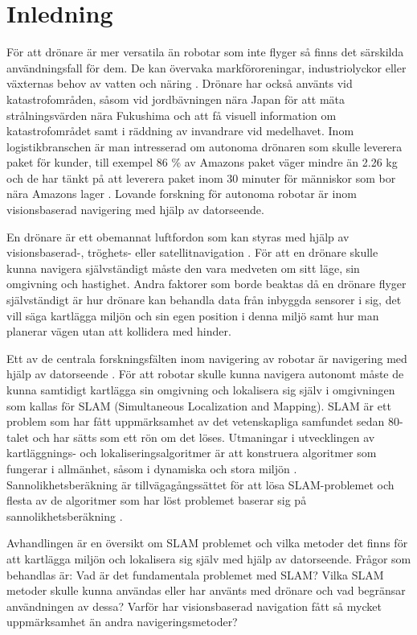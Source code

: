 \chapter{Inledning}

För att drönare är mer versatila än robotar som inte flyger så finns det särskilda användningsfall för dem. De kan övervaka markföroreningar, industriolyckor eller växternas behov av vatten och näring \citep{crowdsurveillance}. Drönare har också använts vid katastrofområden, såsom vid jordbävningen nära Japan för att mäta strålningsvärden nära Fukushima och att få visuell information om katastrofområdet samt i räddning av invandrare vid medelhavet. Inom logistikbranschen är man intresserad om autonoma drönaren som skulle leverera paket för kunder, till exempel 86 \% av Amazons paket väger mindre än 2.26 kg och de har tänkt på att leverera paket inom 30 minuter för människor som bor nära Amazons lager \citep{cbsnews}. Lovande forskning för autonoma robotar är inom visionsbaserad navigering med hjälp av datorseende.

En drönare är ett obemannat luftfordon som kan styras med hjälp av visionsbaserad-, tröghets- eller satellitnavigation \citep{geospatial}. För att en drönare skulle kunna navigera självständigt måste den vara medveten om sitt läge, sin omgivning och hastighet. Andra faktorer som borde beaktas då en drönare flyger självständigt är hur drönare kan behandla data från inbyggda sensorer i sig, det vill säga kartlägga miljön och sin egen position i denna miljö samt hur man planerar vägen utan att kollidera med hinder.

Ett av de centrala forskningsfälten inom navigering av robotar är navigering med hjälp av datorseende \citep{982903}. För att robotar skulle kunna navigera autonomt måste de kunna samtidigt kartlägga sin omgivning och lokalisera sig själv i omgivningen som kallas för SLAM (Simultaneous Localization and Mapping). SLAM är ett problem som har fått uppmärksamhet av det vetenskapliga samfundet sedan 80-talet och har sätts som ett rön om det löses. Utmaningar i utvecklingen av kartläggnings- och lokaliseringsalgoritmer är att konstruera algoritmer som fungerar i allmänhet, såsom i dynamiska och stora miljön \citep{realslamproblem}. Sannolikhetsberäkning är tillvägagångssättet för att lösa SLAM-problemet och flesta av de algoritmer som har löst problemet baserar sig på sannolikhetsberäkning \citep{ProbabilisticRobotics}.

Avhandlingen är en översikt om SLAM problemet och vilka metoder det finns för att kartlägga miljön och lokalisera sig själv med hjälp av datorseende. Frågor som behandlas är: Vad är det fundamentala problemet med SLAM? Vilka SLAM metoder skulle kunna användas eller har använts med drönare och vad begränsar användningen av dessa? Varför har visionsbaserad navigation fått så mycket uppmärksamhet än andra navigeringsmetoder?

